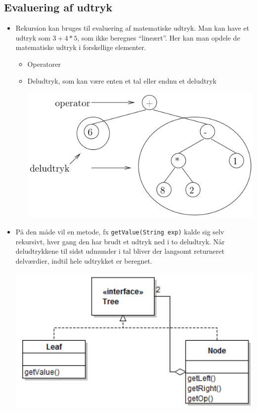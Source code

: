 \subsection{Evaluering af udtryk}

\begin{itemize}
  \item Rekursion kan bruges til evaluering af matematiske udtryk. Man kan have et udtryk som $3+4*5$, som ikke beregnes “lineært”. Her kan man opdele de matematiske udtryk i forskellige elementer.
  \begin{itemize}
    \item Operatorer
    \item Deludtryk, som kan være enten et tal eller endnu et deludtryk
    
    \begin{center}
      \includegraphics[scale=0.7]{images/syntax_tree_math.png}
    \end{center}
    
  \end{itemize}
  
  \item På den måde vil en metode, fx \verb|getValue(String exp)| kalde sig selv rekursivt, hver gang den har brudt et udtryk ned i to deludtryk. Når deludtrykkene til sidst udmunder i tal bliver der langsomt returneret delværdier, indtil hele udtrykket er beregnet.
  
    \begin{center}
      \includegraphics[scale=0.8]{images/composite_pattern.png}
    \end{center}
  
\end{itemize}

